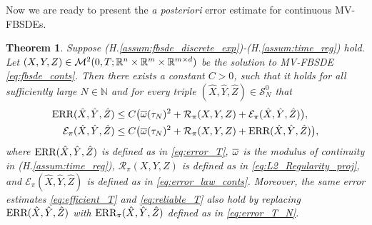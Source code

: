 \documentclass[11pt]{article}
\numberwithin{equation}{section}
\newtheorem{Theorem}{Theorem}[section]
\theoremstyle{definition}
\theoremstyle{remark}
\def\ol{\overline} \def\cl{\centerline}   \def\ul{\underline}
\def\l{\label}  \def\f{\frac}  \def\fa{\forall}
\def\cE{\mathcal{E}}
\def\cM{\mathcal{M}}
\def\cR{\mathcal{R}}
\def\cS{\mathcal{S}}
\def\sN{{\mathbb{N}}}
\def\sR{{\mathbb R}}
\newcommand{\err}{\textnormal{ERR}}
\begin{document}
Now we are ready to present the \textit{a posteriori} error estimate for continuous MV-FBSDEs.

\begin{Theorem}\l{thm:a_posterior_conts}
Suppose (H.\ref{assum:fbsde_discrete_exp})-(H.\ref{assum:time_reg}) hold.
Let
$(X,Y, Z)\in \cM^2(0,T;\sR^n\t \sR^m\t \sR^{m\t d })$ be the solution to MV-FBSDE \eqref{eq:fbsde_conts}.
Then 
there exists a constant $C>0$, such that 
it holds for  all sufficiently large $N\in \sN$
and 
for every 
triple  $(\hat{X},\hat{Y},\hat{Z})\in \cS^0_N$
that
\begin{align}
\err(\hat{X},\hat{Y},\hat{Z})
&\le 
C\big(\ol{\om}(\tau_N)^2
+
\cR_\pi(X,Y,Z)
+\cE_\pi(\hat{X},\hat{Y},\hat{Z})
\big),
\l{eq:efficient_T}
\\
\cE_\pi(\hat{X},\hat{Y},\hat{Z})
&\le 
C\big(\ol{\om}(\tau_N)^2
+
\cR_\pi(X,Y,Z)
+\err(\hat{X},\hat{Y},\hat{Z})
\big),
\l{eq:reliable_T}
\end{align}
where 
$\err(\hat{X},\hat{Y},\hat{Z})$ is 
defined as in \eqref{eq:error_T},
$\ol{\om}$ is the modulus of continuity in (H.\ref{assum:time_reg}),
 $\cR_\pi(X,Y,Z)$ is 
 defined as in \eqref{eq:L2_Regularity_proj},
 and $\cE_\pi(\hat{X},\hat{Y},\hat{Z})$ is 
 defined as in \eqref{eq:error_law_conts}.
Moreover, the same error estimates \eqref{eq:efficient_T} and \eqref{eq:reliable_T} also hold 
by replacing $\err(\hat{X},\hat{Y},\hat{Z})$
with $\err_\pi(\hat{X},\hat{Y},\hat{Z})$
 defined as in \eqref{eq:error_T_N}.
\end{Theorem}
\end{document}
